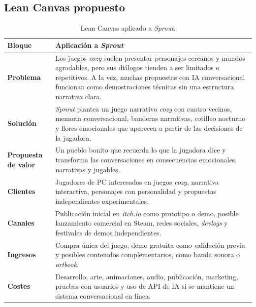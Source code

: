 \documentclass[12pt,twoside,titlepage]{report}
\begin{document}
\subsection{Lean Canvas propuesto}

\begin{table}[h]
\centering
\caption{Lean Canvas aplicado a \textit{Sprout}.}
\label{tab:lean_canvas_sprout}
\begin{footnotesize}
\renewcommand{\arraystretch}{1.35}
\begin{tabular}{|p{}|p{}|}
\hline
\textbf{Bloque} & \textbf{Aplicación a \textit{Sprout}} \\
\hline

\textbf{Problema} &
Los juegos \textit{cozy} suelen presentar personajes cercanos y mundos agradables, pero sus diálogos tienden a ser limitados o repetitivos. A la vez, muchas propuestas con IA conversacional funcionan como demostraciones técnicas sin una estructura narrativa clara. \\
\hline

\textbf{Solución} &
\textit{Sprout} plantea un juego narrativo \textit{cozy} con cuatro vecinos, memoria conversacional, banderas narrativas, cotilleo nocturno y flores emocionales que aparecen a partir de las decisiones de la jugadora. \\
\hline

\textbf{Propuesta de valor} &
Un pueblo bonito que recuerda lo que la jugadora dice y transforma las conversaciones en consecuencias emocionales, narrativas y jugables. \\
\hline

\textbf{Clientes} &
Jugadores de PC interesados en juegos \textit{cozy}, narrativa interactiva, personajes con personalidad y propuestas independientes experimentales. \\
\hline

\textbf{Canales} &
Publicación inicial en \textit{itch.io} como prototipo o demo, posible lanzamiento comercial en Steam, redes sociales, \textit{devlogs} y festivales de demos independientes. \\
\hline

\textbf{Ingresos} &
Compra única del juego, demo gratuita como validación previa y posibles contenidos complementarios, como banda sonora o \textit{artbook}. \\
\hline

\textbf{Costes} &
Desarrollo, arte, animaciones, audio, publicación, marketing, pruebas con usuarios y uso de API de IA si se mantiene un sistema conversacional en línea. \\
\hline


\end{tabular}
\end{footnotesize}
\end{table}
\end{document}
